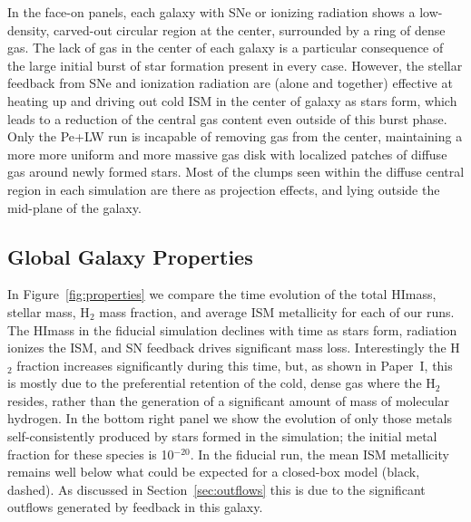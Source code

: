 \documentclass[twocolumn]{aastex62}
\newcommand{\HI}{HI}
\begin{document}
In the face-on panels, each galaxy with SNe or ionizing radiation shows a low-density, carved-out circular region at the center, surrounded by a ring of dense gas. The lack of gas in the center of each galaxy is a particular consequence of the large initial burst of star formation present in every case. However, the stellar feedback from SNe and ionization radiation are (alone and together) effective at heating up and driving out cold ISM in the center of galaxy as stars form, which leads to a reduction of the central gas content even outside of this burst phase. Only the Pe+LW run is incapable of removing gas from the center, maintaining a more more uniform and more massive gas disk with localized patches of diffuse gas around newly formed stars. Most of the clumps seen within the diffuse central region in each simulation are there as projection effects, and lying outside the mid-plane of the galaxy. 



\subsection{Global Galaxy Properties}
\label{sec:galaxy properties}

In Figure~\ref{fig:properties} we compare the time evolution of the total \HI mass, stellar mass, H$_2$ mass fraction, and average ISM metallicity for each of our runs. The \HI mass in the fiducial simulation declines with time as stars form, radiation ionizes the ISM, and SN feedback drives significant mass loss. Interestingly the H$_2$ fraction increases significantly during this time, but, as shown in Paper~I, this is mostly due to the preferential retention of the cold, dense gas where the H$_2$ resides, rather than the generation of a significant amount of mass of molecular hydrogen. In the bottom right panel we show the evolution of only those metals self-consistently produced by stars formed in the simulation; the initial metal fraction for these species is 10$^{-20}$. In the fiducial run, the mean ISM metallicity remains well below what could be expected for a closed-box model (black, dashed). As discussed in Section~\ref{sec:outflows} this is due to the significant outflows generated by feedback in this galaxy. 
\end{document}
